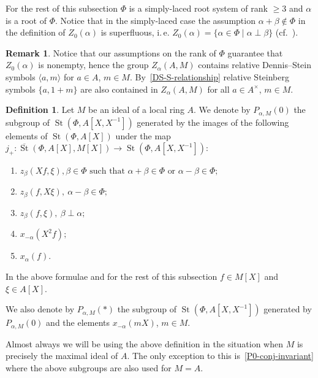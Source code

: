 \documentclass[oneside, 8pt]{amsart}
\theoremstyle{remark}
\theoremstyle{definition}
\numberwithin{lemma}{section}
\numberwithin{prop}{section}
\numberwithin{corollary}{section}
\numberwithin{externaltheorem}{section}
\newtheorem{df}[lemma]{Definition} \Crefname{df}{Definition}{Definitions}
\newtheorem{rem}[lemma]{Remark}
\DeclareMathOperator{\St}{St}
\numberwithin{equation}{section}
\begin{document}
For the rest of this subsection $\Phi$ is a simply-laced root system of rank $\geq 3$ and $\alpha$ is a root of $\Phi$. Notice that in the simply-laced case the assumption $\alpha+\beta\not\in \Phi$ in the definition of $Z_0(\alpha)$ is superfluous, i.\,e. $Z_0(\alpha) = \{ \alpha\in\Phi \mid \alpha \perp \beta \}$
(cf.~\cite[Proposition~5.7]{St71}).

\begin{rem}\label{Z-DS} Notice that our assumptions on the rank of $\Phi$ guarantee that $Z_0(\alpha)$ is nonempty, hence the group $Z_\alpha(A, M)$ contains relative Dennis--Stein symbols $\langle a, m \rangle$ for $a\in A$, $m\in M$.
By~\eqref{DS-S-relationship} relative Steinberg symbols $\{a, 1+m\}$ are also contained in $Z_\alpha(A, M)$ for all $a\in A^\times$, $m\in M$. \end{rem}

\begin{df} \label{defP0}
Let $M$ be an ideal of a local ring $A$. We denote by $P_{\alpha, M}(0)$ the subgroup of $\St(\Phi, A[X, X^{-1}])$ generated by the images of the following elements of $\St(\Phi, A[X])$ under the
 map $j_+ \colon \overline{\St}(\Phi, A[X], M[X]) \to \St(\Phi, A[X, X^{-1}])$:
\begin{enumerate} \item $z_{\beta}(Xf, \xi), \beta \in \Phi \text{ such that }\alpha + \beta \in \Phi\text{ or } \alpha - \beta \in \Phi;$
 \item $z_{\beta}(f, X\xi),\ \alpha - \beta \in \Phi;$
 \item $z_{\beta}(f, \xi),\ \beta \perp \alpha;$
 \item $x_{-\alpha}(X^2f);$
 \item $x_{\alpha}(f)$. \end{enumerate}
In the above formulae and for the rest of this subsection $f \in M[X]$ and $\xi \in A[X]$. 

We also denote by $P_{\alpha, M}(*)$ the subgroup of $\St(\Phi, A[X, X^{-1}])$ generated by $P_{\alpha, M}(0)$ and the elements $x_{-\alpha}(mX)$, $m \in M$.
\end{df}

Almost always we will be using the above definition in the situation when $M$ is precisely the maximal ideal of $A$.
The only exception to this is~\cref{P0-conj-invariant} where the above subgroups are also used for $M=A$.
\end{document}
